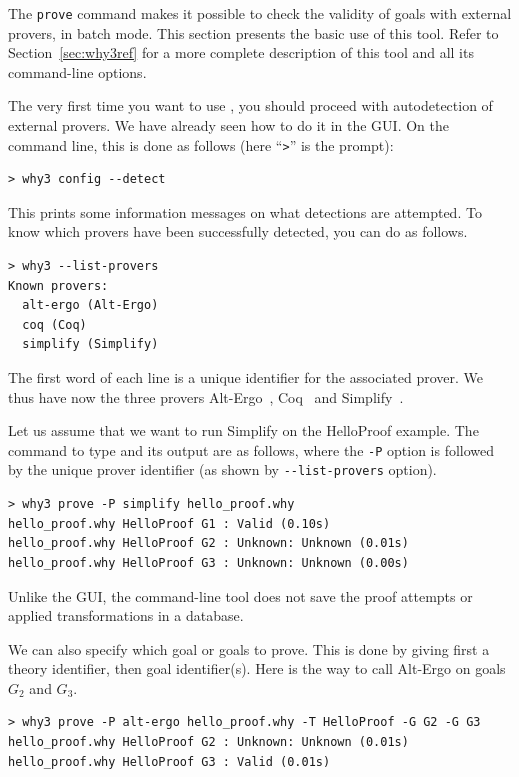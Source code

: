 The \texttt{prove} command makes it possible to check the validity of goals with external
provers, in batch mode. This section presents the basic use of this
tool. Refer to Section~\ref{sec:why3ref} for a more complete
description of this tool and all its command-line options.

The very first time you want to use \why, you should proceed with
autodetection of external provers. We have already seen how to do
it in the \why GUI. On the command line, this is done as follows
(here ``\texttt{>}'' is the prompt):
\begin{verbatim}
> why3 config --detect
\end{verbatim}
This prints some information messages on what detections are attempted. To know which
provers have been successfully detected, you can do as follows.
\begin{verbatim}
> why3 --list-provers
Known provers:
  alt-ergo (Alt-Ergo)
  coq (Coq)
  simplify (Simplify)
\end{verbatim}
The first word of each line is a unique identifier for the associated prover. We thus
have now the three provers Alt-Ergo~\cite{ergo}, Coq~\cite{CoqArt} and
Simplify~\cite{simplify05}.

Let us assume that we want to run Simplify on the HelloProof
example. The command to type and its output are as follows, where the
\verb|-P| option is followed by the unique prover identifier (as shown
by \verb|--list-provers| option).
\begin{verbatim}
> why3 prove -P simplify hello_proof.why
hello_proof.why HelloProof G1 : Valid (0.10s)
hello_proof.why HelloProof G2 : Unknown: Unknown (0.01s)
hello_proof.why HelloProof G3 : Unknown: Unknown (0.00s)
\end{verbatim}
Unlike the \why GUI, the command-line tool does not save the proof attempts
or applied transformations in a database.

We can also specify which goal or goals to prove. This is done by giving
first a theory identifier, then goal identifier(s). Here is the way to
call Alt-Ergo on goals $G_2$ and $G_3$.
\begin{verbatim}
> why3 prove -P alt-ergo hello_proof.why -T HelloProof -G G2 -G G3
hello_proof.why HelloProof G2 : Unknown: Unknown (0.01s)
hello_proof.why HelloProof G3 : Valid (0.01s)
\end{verbatim}

